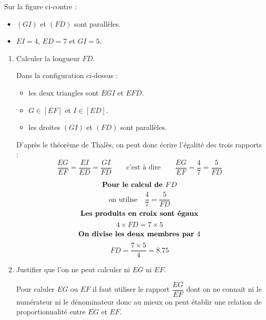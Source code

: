 \begin{corrige}
    \phantom{rrr}

    \begin{minipage}{0.6\linewidth}
        Sur la figure ci-contre :
        \begin{itemize}
            \item $(GI)$ et $(FD)$ sont parallèles.
            \item $EI=4$, $ED=7$ et $GI=5$.
        \end{itemize}
    \end{minipage}
    \begin{minipage}{0.3\linewidth}   
    \end{minipage}
    \begin{multicols}{2}
        \begin{enumerate}
            \item Calculer la longueur $FD$.
            
            {\color{red}
            Dans la configuration ci-dessus : 
            \begin{itemize}
                \item les deux triangles sont $EGI$ et $EFD$.
                \item $G \in [EF]$ et $I \in [ED]$.
                \item les droites $(GI)$ et $(FD)$ sont parallèles.                
            \end{itemize}
            D'après le théorème de Thalès, on peut donc écrire l'égalité des trois rapports :
            $$\frac{EG}{EF}=\frac{EI}{ED}=\frac{GI}{FD}\qquad\mbox{c'est à dire}\qquad\frac{EG}{EF}=\frac{4}{7}=\frac{5}{FD}$$
            
                $$\mbox{\bf Pour le calcul de $FD$}$$
                $$\mbox{on utilise} \quad \dfrac{4}{7}=\dfrac{5}{FD}$$
                $$\mbox{\bf Les produits en croix sont égaux}$$
                $$4\times FD=7\times5$$
                $$\mbox{\bf On divise les deux membres par $4$}$$                
                $$FD=\frac{7\times5}{4}=\num{8.75}$$            
            }
            \columnbreak
            \item Justifier que l'on ne peut calculer ni $EG$ ni $EF$.
            
            {\color{red} Pour caluler $EG$ ou $EF$ il faut utiliser le rapport $\dfrac{EG}{EF}$ dont on ne connait ni le 
            numérateur ni le dénominateur donc au mieux on peut établir une relation de proportionnalité entre $EG$ et $EF$.}
        \end{enumerate}
    \end{multicols}
\end{corrige}

